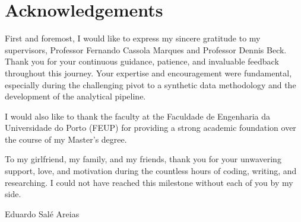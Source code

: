 \chapter*{Acknowledgements}

First and foremost, I would like to express my sincere gratitude to my supervisors, Professor Fernando Cassola Marques and Professor Dennis Beck. Thank you for your continuous guidance, patience, and invaluable feedback throughout this journey. Your expertise and encouragement were fundamental, especially during the challenging pivot to a synthetic data methodology and the development of the analytical pipeline.

I would also like to thank the faculty at the Faculdade de Engenharia da Universidade do Porto (FEUP) for providing a strong academic foundation over the course of my Master's degree.

To my girlfriend, my family, and my friends, thank you for your unwavering support, love, and motivation during the countless hours of coding, writing, and researching. I could not have reached this milestone without each of you by my side.

\vspace{10mm}

\begin{flushleft}
Eduardo Salé Areias
\end{flushleft}